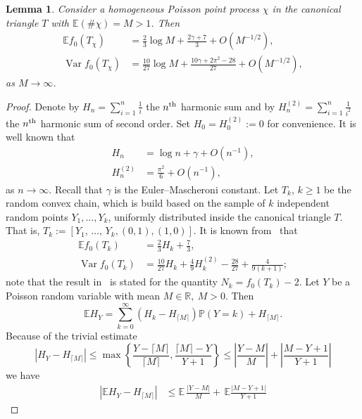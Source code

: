 \documentclass[10pt]{amsart}
\newtheorem{lemm}[theo]{Lemma}\newtheorem{prop}[theo]{Proposition}\newtheorem{coro}[theo]{Corollary}\newtheorem{conj}[theo]{Conjecture}
\theoremstyle{definition}\newtheorem{defi}[theo]{Definition}\newtheorem{rema}[theo]{Remark}\newtheorem{exam}[theo]{Example}\newtheorem{exem}[theo]{Example}\newtheorem{nota}[theo]{Notation}
\newcommand{\var}{\operatorname{Var}}
\newcommand{\bbR}{\mathbb{R}}
\newcommand{\bbE}{\mathbb{E}}
\newcommand{\bbP}{\mathbb{P}}
\begin{document}
\begin{lemm}\label{lm:estimatesPoissonChain}
Consider a homogeneous Poisson point process $\chi$ in the canonical triangle $T$ with $\bbE(\# \chi)=M>1$. Then
\begin{align}
\bbE f_0(T_{\chi})&=\frac{2}{3}\log M + \frac {2\gamma +7}3 +O\left(M^{-1/2}\right),\label{eq:poissonExp}
\\
\var f_0(T_{\chi})&= \frac {10}{27} \log M + \frac{10 \gamma + 2\pi^2 - 28 }{27} + O\left(M^{-1/2}\right),\label{eq:poissonVar}
\end{align}
as $M\to\infty$.
\end{lemm}


\begin{proof}
Denote by $H_n = \sum_{i=1}^{n} \frac 1i$ the $n^{\rm th}$ harmonic sum and by $H^{(2)}_n = \sum_{i=1}^{n} \frac 1{i^2}$ the $n^{\rm th}$ harmonic sum of second order. Set $H_0= H^{(2)}_0:=0$ for convenience. It is well known that
\begin{align}
H_n &= \log n +\gamma + O(n^{-1}) \label{eq:HarmNum1}
,\\
H^{(2)}_n &= \frac{\pi^2}6+O(n^{-1}) \label{eq:HarmNum2}
,
\end{align}
as $n \to \infty$. Recall that $\gamma$ is the Euler--Mascheroni constant. Let $T_k$, $k\ge 1$ be the random convex chain, which is build based on the sample of $k$ independent random points $Y_1,\ldots, Y_k$, uniformly distributed inside the canonical triangle $T$. That is, $T_k:=[Y_1,\,\ldots,\,Y_k,(0,1),(1,0)]$. It is known from~\cite[Corollary~1 and Corollary~2]{Buch12} that
\begin{align}\label{eq:expUnif}
\bbE f_0(T_k)&= \frac{2}{3} H_k + \frac 73,
\\\label{eq:varUnif}
\var f_0(T_k)&=\frac{10}{27} H_k + \frac{4}{9} H^{(2)}_k - \frac{28}{27 } + \frac{4}{9(k+1)} ;
\end{align}
note that the result in~\cite{Buch12} is stated for the quantity $N_k= f_0(T_k)-2$. Let $Y$ be a Poisson random variable with mean $M \in \bbR,\ M >0$. Then
\[
\bbE H_Y =
\sum_{k=0}^\infty \left(H_k-H_{\lceil M \rceil}\right) \bbP(Y=k) + H_{\lceil M \rceil}.
\]
Because of the trivial estimate
\[
\left|H_Y-H_{\lceil M \rceil}\right| \leq \max \left\{ \frac {Y-\lceil M \rceil}{\lceil M \rceil}, \frac {\lceil M \rceil-Y}{Y+1} \right\}
\leq
\left|\frac {Y-M}M \right| + \left|\frac {M-Y+1}{Y+1} \right|
\]
we have
\begin{align*}
\left|\bbE H_Y - H_{\lceil M \rceil} \right| & \leq
\bbE \, \frac {|Y-M|}M + \, \bbE \frac {|M-Y+1|}{Y+1}

\end{align*}
\end{proof}
\end{document}
